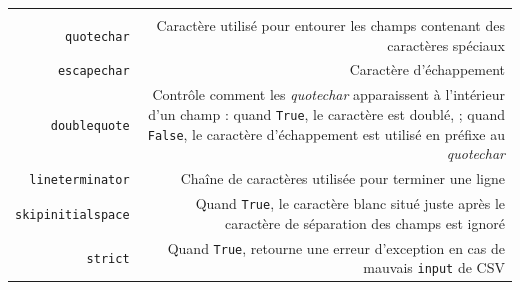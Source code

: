 \documentclass[12pt,]{book}
\numberwithin{equation}{section}
\numberwithin{countremarque}{section}
\begin{document}
\begin{longtable}[]{@{}rr@{}}
\begin{minipage}[t]{0.61\columnwidth}
\end{minipage}\tabularnewline
\begin{minipage}[t]{0.26\columnwidth}\raggedleft\strut
\texttt{quotechar}\strut
\end{minipage} & \begin{minipage}[t]{0.61\columnwidth}\raggedleft\strut
Caractère utilisé pour entourer les champs contenant des caractères
spéciaux\strut
\end{minipage}\tabularnewline
\begin{minipage}[t]{0.26\columnwidth}\raggedleft\strut
\texttt{escapechar}\strut
\end{minipage} & \begin{minipage}[t]{0.61\columnwidth}\raggedleft\strut
Caractère d'échappement\strut
\end{minipage}\tabularnewline
\begin{minipage}[t]{0.26\columnwidth}\raggedleft\strut
\texttt{doublequote}\strut
\end{minipage} & \begin{minipage}[t]{0.61\columnwidth}\raggedleft\strut
Contrôle comment les \emph{quotechar} apparaissent à l'intérieur d'un
champ : quand \texttt{True}, le caractère est doublé, ; quand
\texttt{False}, le caractère d'échappement est utilisé en préfixe au
\emph{quotechar}\strut
\end{minipage}\tabularnewline
\begin{minipage}[t]{0.26\columnwidth}\raggedleft\strut
\texttt{lineterminator}\strut
\end{minipage} & \begin{minipage}[t]{0.61\columnwidth}\raggedleft\strut
Chaîne de caractères utilisée pour terminer une ligne\strut
\end{minipage}\tabularnewline
\begin{minipage}[t]{0.26\columnwidth}\raggedleft\strut
\texttt{skipinitialspace}\strut
\end{minipage} & \begin{minipage}[t]{0.61\columnwidth}\raggedleft\strut
Quand \texttt{True}, le caractère blanc situé juste après le caractère
de séparation des champs est ignoré\strut
\end{minipage}\tabularnewline
\begin{minipage}[t]{0.26\columnwidth}\raggedleft\strut
\texttt{strict}\strut
\end{minipage} & \begin{minipage}[t]{0.61\columnwidth}\raggedleft\strut
Quand \texttt{True}, retourne une erreur d'exception en cas de mauvais
\texttt{input} de CSV\strut
\end{minipage}\tabularnewline
\bottomrule
\end{longtable}
\end{document}
